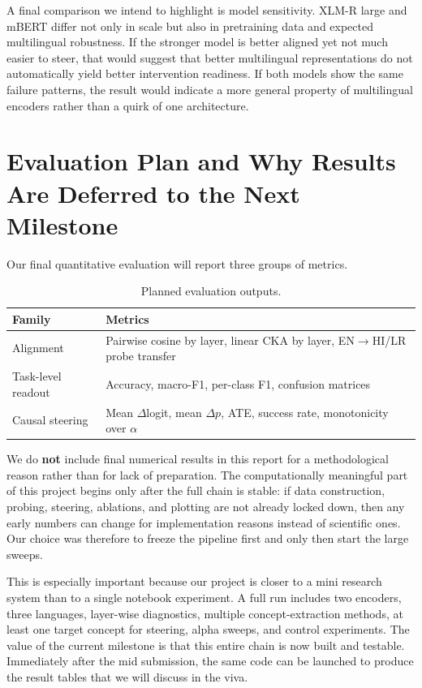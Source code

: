 \documentclass[11pt]{article}
\begin{document}
A final comparison we intend to highlight is model sensitivity. XLM-R large and mBERT differ not only in scale but also in pretraining data and expected multilingual robustness. If the stronger model is better aligned yet not much easier to steer, that would suggest that better multilingual representations do not automatically yield better intervention readiness. If both models show the same failure patterns, the result would indicate a more general property of multilingual encoders rather than a quirk of one architecture.

\section{Evaluation Plan and Why Results Are Deferred to the Next Milestone}
Our final quantitative evaluation will report three groups of metrics.
\begin{table}[t]
\centering
\small
\begin{tabular}{p{}p{}}
\toprule
\textbf{Family} & \textbf{Metrics} \\
\midrule
Alignment & Pairwise cosine by layer, linear CKA by layer, EN$\rightarrow$HI/LR probe transfer \\
Task-level readout & Accuracy, macro-F1, per-class F1, confusion matrices \\
Causal steering & Mean $\Delta$logit, mean $\Delta p$, ATE, success rate, monotonicity over $\alpha$ \\
\bottomrule
\end{tabular}
\caption{Planned evaluation outputs.}
\label{tab:metrics}
\end{table}

We do \textbf{not} include final numerical results in this report for a methodological reason rather than for lack of preparation. The computationally meaningful part of this project begins only after the full chain is stable: if data construction, probing, steering, ablations, and plotting are not already locked down, then any early numbers can change for implementation reasons instead of scientific ones. Our choice was therefore to freeze the pipeline first and only then start the large sweeps.

This is especially important because our project is closer to a mini research system than to a single notebook experiment. A full run includes two encoders, three languages, layer-wise diagnostics, multiple concept-extraction methods, at least one target concept for steering, alpha sweeps, and control experiments. The value of the current milestone is that this entire chain is now built and testable. Immediately after the mid submission, the same code can be launched to produce the result tables that we will discuss in the viva.
\end{document}
